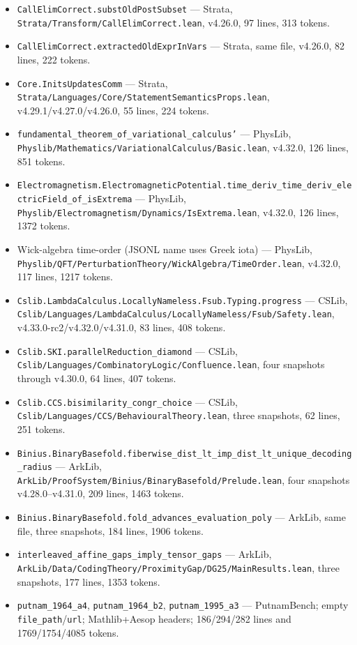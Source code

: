 \documentclass{article}
\begin{document}
\sloppy
\begin{itemize}\raggedright
  \item \texttt{CallElimCorrect.substOldPostSubset} --- Strata, \texttt{Strata/Transform/CallElimCorrect.lean}, v4.26.0, 97 lines, 313 tokens.
  \item \texttt{CallElimCorrect.extractedOldExprInVars} --- Strata, same file, v4.26.0, 82 lines, 222 tokens.
  \item \texttt{Core.InitsUpdatesComm} --- Strata, \texttt{Strata/Languages/Core/\allowbreak StatementSemanticsProps.lean}, v4.29.1/v4.27.0/v4.26.0, 55 lines, 224 tokens.
  \item \texttt{fundamental\_theorem\_of\_variational\_calculus'} --- PhysLib, \texttt{Physlib/Mathematics/\allowbreak VariationalCalculus/Basic.lean}, v4.32.0, 126 lines, 851 tokens.
  \item \texttt{Electromagnetism.ElectromagneticPotential.\allowbreak time\_deriv\_time\_deriv\_electricField\_of\_isExtrema} --- PhysLib, \texttt{Physlib/Electromagnetism/Dynamics/IsExtrema.lean}, v4.32.0, 126 lines, 1372 tokens.
  \item Wick-algebra time-order (JSONL name uses Greek iota) --- PhysLib, \texttt{Physlib/QFT/\allowbreak PerturbationTheory/WickAlgebra/TimeOrder.lean}, v4.32.0, 117 lines, 1217 tokens.
  \item \texttt{Cslib.LambdaCalculus.LocallyNameless.\allowbreak Fsub.Typing.progress} --- CSLib, \texttt{Cslib/Languages/\allowbreak LambdaCalculus/LocallyNameless/Fsub/Safety.lean}, v4.33.0-rc2/v4.32.0/v4.31.0, 83 lines, 408 tokens.
  \item \texttt{Cslib.SKI.parallelReduction\_diamond} --- CSLib, \texttt{Cslib/Languages/\allowbreak CombinatoryLogic/Confluence.lean}, four snapshots through v4.30.0, 64 lines, 407 tokens.
  \item \texttt{Cslib.CCS.bisimilarity\_congr\_choice} --- CSLib, \texttt{Cslib/Languages/CCS/\allowbreak BehaviouralTheory.lean}, three snapshots, 62 lines, 251 tokens.
  \item \texttt{Binius.BinaryBasefold.\allowbreak fiberwise\_dist\_lt\_imp\_dist\_lt\_unique\_decoding\_radius} --- ArkLib, \texttt{ArkLib/ProofSystem/\allowbreak Binius/BinaryBasefold/Prelude.lean}, four snapshots v4.28.0--v4.31.0, 209 lines, 1463 tokens.
  \item \texttt{Binius.BinaryBasefold.fold\_advances\_evaluation\_poly} --- ArkLib, same file, three snapshots, 184 lines, 1906 tokens.
  \item \texttt{interleaved\_affine\_gaps\_imply\_tensor\_gaps} --- ArkLib, \texttt{ArkLib/Data/\allowbreak CodingTheory/ProximityGap/DG25/MainResults.lean}, three snapshots, 177 lines, 1353 tokens.
  \item \texttt{putnam\_1964\_a4}, \texttt{putnam\_1964\_b2}, \texttt{putnam\_1995\_a3} --- PutnamBench; empty \texttt{file\_path}/\texttt{url}; Mathlib+Aesop headers; 186/294/282 lines and 1769/1754/4085 tokens.
\end{itemize}
\end{document}
